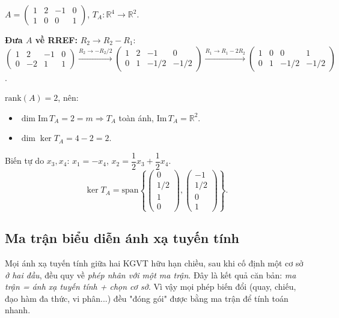\documentclass[12pt,a4paper]{article}
\begin{document}
\begin{vidu}[title={$T_A(\mathbf{x}) = A\mathbf{x}$ -- xác định $\ker$ và $\mathrm{Im}$}]
$A = \begin{pmatrix}1 & 2 & -1 & 0\\ 1 & 0 & 0 & 1\end{pmatrix}$, $T_A: \mathbb{R}^4 \to \mathbb{R}^2$.

\textbf{Đưa $A$ về RREF:} $R_2 \to R_2 - R_1$: $\begin{pmatrix}1&2&-1&0\\0&-2&1&1\end{pmatrix} \xrightarrow{R_2 \to -R_2/2} \begin{pmatrix}1&2&-1&0\\0&1&-1/2&-1/2\end{pmatrix} \xrightarrow{R_1 \to R_1 - 2R_2} \begin{pmatrix}1&0&0&1\\0&1&-1/2&-1/2\end{pmatrix}$.

$\mathrm{rank}(A) = 2$, nên:
\begin{itemize}
  \item $\dim\mathrm{Im}\,T_A = 2 = m \Rightarrow T_A$ toàn ánh, $\mathrm{Im}\,T_A = \mathbb{R}^2$.
  \item $\dim\ker T_A = 4 - 2 = 2$.
\end{itemize}
Biến tự do $x_3, x_4$: $x_1 = -x_4$, $x_2 = \dfrac{1}{2}x_3 + \dfrac{1}{2}x_4$.
\[
  \ker T_A = \mathrm{span}\left\{\begin{pmatrix}0\\1/2\\1\\0\end{pmatrix}, \begin{pmatrix}-1\\1/2\\0\\1\end{pmatrix}\right\}.
\]
\end{vidu}

\subsection{Ma trận biểu diễn ánh xạ tuyến tính}

\begin{dongco}
Mọi ánh xạ tuyến tính giữa hai KGVT hữu hạn chiều, sau khi cố định một cơ sở \emph{ở hai đầu}, đều quy về \emph{phép nhân với một ma trận}. Đây là kết quả căn bản: \emph{ma trận = ánh xạ tuyến tính + chọn cơ sở}. Vì vậy mọi phép biến đổi (quay, chiếu, đạo hàm đa thức, vi phân...) đều "đóng gói" được bằng ma trận để tính toán nhanh.
\end{dongco}
\end{document}
